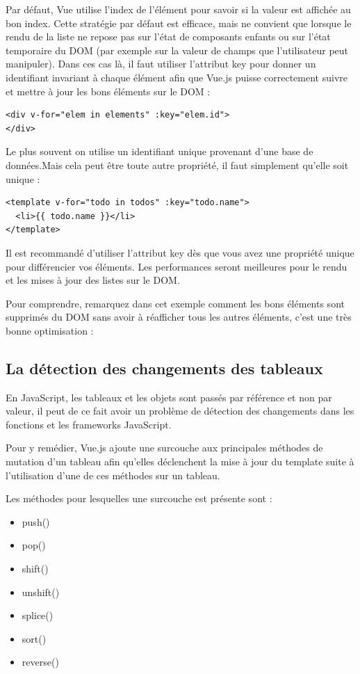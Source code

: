 \documentclass{article}
\begin{document}
Par défaut, {\color{monOrange}Vue} utilise l'index de l'élément pour savoir si la valeur est affichée au bon index. Cette stratégie par défaut est efficace, mais ne convient que lorsque le rendu de la liste ne repose pas sur l'état de composants enfants ou sur l'état temporaire du DOM (par exemple sur la valeur de champs que l'utilisateur peut manipuler). Dans ces cas là, il faut utiliser l'attribut key pour donner un identifiant invariant à chaque élément afin que Vue.js puisse correctement suivre et mettre à jour les bons éléments sur le DOM :
\begin{verbatim}
<div v-for="elem in elements" :key="elem.id">
</div>
\end{verbatim}
Le plus souvent on utilise un identifiant unique provenant d'une base de données.Mais cela peut être toute autre propriété, il faut simplement qu'elle soit unique :
\begin{verbatim}
<template v-for="todo in todos" :key="todo.name">
  <li>{{ todo.name }}</li>
</template>
\end{verbatim}
Il est recommandé d'utiliser l'attribut {\color{monOrange}key} dès que vous avez une propriété unique pour différencier vos éléments. Les performances seront meilleures pour le rendu et les mises à jour des listes sur le DOM.

Pour comprendre, remarquez dans cet exemple comment les bons éléments sont supprimés du DOM sans avoir à réafficher tous les autres éléments, c'est une très bonne optimisation :


\subsection{La détection des changements des tableaux}
En JavaScript, les tableaux et les objets sont passés par référence et non par valeur, il peut de ce fait avoir un problème de détection des changements dans les fonctions et les frameworks JavaScript.

Pour y remédier, {\color{monOrange}Vue.js} ajoute une surcouche aux principales méthodes de mutation d'un tableau afin qu'elles déclenchent la mise à jour du {\color{monOrange}template} suite à l'utilisation d'une de ces méthodes sur un tableau.

Les méthodes pour lesquelles une surcouche est présente sont :
\begin{itemize}
\item {\color{blue} push()}
\item {\color{blue} pop()}
\item {\color{blue} shift()}
\item {\color{blue} unshift()}
\item {\color{blue} splice()}
\item {\color{blue} sort()}
\item {\color{blue} reverse()}
\end{itemize}
\end{document}
